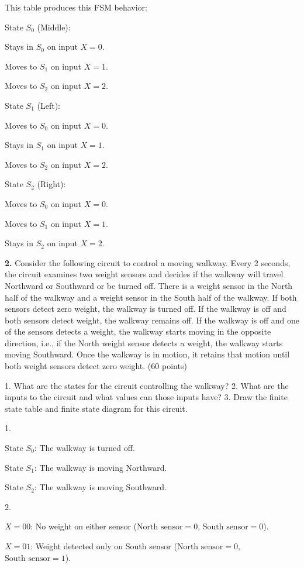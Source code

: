 \documentclass{article}
\begin{document}
This table produces this FSM behavior:

State $S_0$ (Middle):

Stays in $S_0$ on input $X = 0$.

Moves to $S_1$ on input $X = 1$.

Moves to $S_2$ on input $X = 2$.

State $S_1$ (Left):

Moves to $S_0$ on input $X = 0$.

Stays in $S_1$ on input $X = 1$.

Moves to $S_2$ on input $X = 2$.

State $S_2$ (Right):

Moves to $S_0$ on input $X = 0$.

Moves to $S_1$ on input $X = 1$.

Stays in $S_2$ on input $X = 2$.


\newpage


\textbf{2.} Consider the following circuit to control a moving walkway. Every 2 seconds,
the circuit examines two weight sensors and decides if the walkway will travel Northward
or Southward or be turned off. There is a weight sensor in the North half of the walkway
and a weight sensor in the South half of the walkway. If both sensors detect zero weight,
the walkway is turned off. If the walkway is off and both sensors detect weight, the walkway
remains off. If the walkway is off and one of the sensors detects a weight, the walkway
starts moving in the opposite direction, i.e., if the North weight sensor detects a weight,
the walkway starts moving Southward. Once the walkway is in motion, it retains that motion
until both weight sensors detect zero weight. (60 points)

    1. What are the states for the circuit controlling the walkway?
    2. What are the inputs to the circuit and what values can those inputs have?
    3. Draw the finite state table and finite state diagram for this circuit.

1.

State $S_0$: The walkway is turned off.

State $S_1$: The walkway is moving Northward.

State $S_2$: The walkway is moving Southward.

2.

$X = 00$: No weight on either sensor ($\text{North sensor} = 0$, $\text{South sensor} = 0$).

$X = 01$: Weight detected only on South sensor ($\text{North sensor} = 0$, $\text{South sensor} = 1$).
\end{document}
